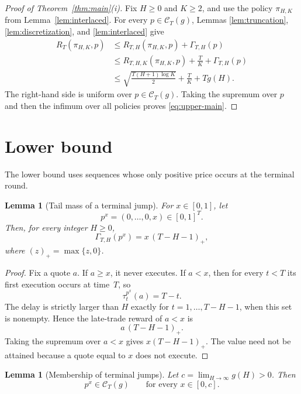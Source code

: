 \documentclass[11pt]{article}
\newtheorem{lemma}[theorem]{Lemma}
\theoremstyle{remark}
\newcommand{\C}{\mathcal{C}}
\newcommand{\Tau}{\tau}
\newcommand{\GammaTail}{\Gamma}
\begin{document}
\begin{proof}[Proof of Theorem~\ref{thm:main}(i)]
Fix $H\ge0$ and $K\ge2$, and use the policy $\pi_{H,K}$ from
Lemma~\ref{lem:interlaced}.  For every $p\in\C_T(g)$, Lemmas
\ref{lem:truncation}, \ref{lem:discretization}, and \ref{lem:interlaced} give
\begin{align*}
    R_T(\pi_{H,K},p)
    &\le
    R_{T,H}(\pi_{H,K},p)+\GammaTail_{T,H}(p)\\
    &\le
    R_{T,H,K}(\pi_{H,K},p)
    +\frac{T}{K}
    +\GammaTail_{T,H}(p)\\
    &\le
    \sqrt{\frac{T(H+1)\log K}{2}}
    +\frac{T}{K}
    +Tg(H).
\end{align*}
The right-hand side is uniform over $p\in\C_T(g)$.  Taking the supremum over
$p$ and then the infimum over all policies proves \eqref{eq:upper-main}.
\end{proof}

\section{Lower bound}

The lower bound uses sequences whose only positive price occurs at the terminal
round.

\begin{lemma}[Tail mass of a terminal jump]\label{lem:terminal-tail}
For $x\in[0,1]$, let
\[
    p^x=(0,\ldots,0,x)\in[0,1]^T.
\]
Then, for every integer $H\ge0$,
\begin{equation}\label{eq:terminal-gamma}
    \GammaTail_{T,H}(p^x)
    =
    x\,(T-H-1)_+,
\end{equation}
where $(z)_+=\max\{z,0\}$.
\end{lemma}

\begin{proof}
Fix a quote $a$.  If $a\ge x$, it never executes.  If $a<x$, then for every
$t<T$ its first execution occurs at time~$T$, so
\[
    \Tau_t^{p^x}(a)=T-t.
\]
The delay is strictly larger than $H$ exactly for
$t=1,\ldots,T-H-1$, when this set is nonempty.  Hence the late-trade reward of
$a<x$ is
\[
    a\,(T-H-1)_+.
\]
Taking the supremum over $a<x$ gives $x(T-H-1)_+$.  The value need not be
attained because a quote equal to $x$ does not execute.
\end{proof}

\begin{lemma}[Membership of terminal jumps]\label{lem:terminal-membership}
Let $c=\lim_{H\to\infty}g(H)>0$.  Then
\[
    p^x\in\C_T(g)
    \qquad\text{for every }x\in[0,c].
\]
\end{lemma}
\end{document}
